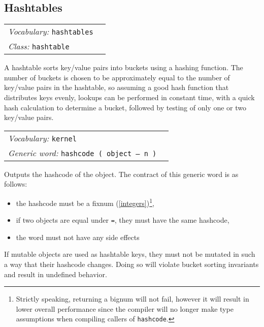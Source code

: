 \documentclass{book}
\newcommand{\vocabulary}[1]{\emph{Vocabulary:} \texttt{#1}&\\}
\newcommand{\classword}[1]{\index{\texttt{#1}}\emph{Class:} \texttt{#1}&\\}
\newcommand{\genericword}[2]{\index{\texttt{#1}}\emph{Generic word:} \texttt{#2}&\\}
\newcommand{\wordtable}[1]{


\begin{tabularx}{12cm}{lX}
\hline
#1
\hline
\end{tabularx}

}
\begin{document}
\subsection{Hashtables}\label{hashtables}

\hashglos
{}
\wordtable{
\vocabulary{hashtables}
\classword{hashtable}
}
A hashtable sorts key/value pairs into buckets using a hashing function. The number of buckets is chosen to be approximately equal to the number of key/value pairs in the hashtable, so assuming a good hash function that distributes keys evenly, lookups can be performed in constant time, with a quick hash calculation to determine a bucket, followed by testing of only one or two key/value pairs.
\wordtable{
\vocabulary{kernel}
\genericword{hashcode}{hashcode~( object -- n )}
}
Outputs the hashcode of the object. The contract of this generic word is as follows:
\begin{itemize}
\item the hashcode must be a fixnum (\ref{integers})\footnote{Strictly speaking, returning a bignum will not fail, however it will result in lower overall performance since the compiler will no longer make type assumptions when compiling callers of \texttt{hashcode}.},
\item if two objects are equal under \texttt{=}, they must have the same hashcode,
\item the word must not have any side effects
\end{itemize}
If mutable objects are used as hashtable keys, they must not be mutated in such a way that their hashcode changes. Doing so will violate bucket sorting invariants and result in undefined behavior.
\end{document}
